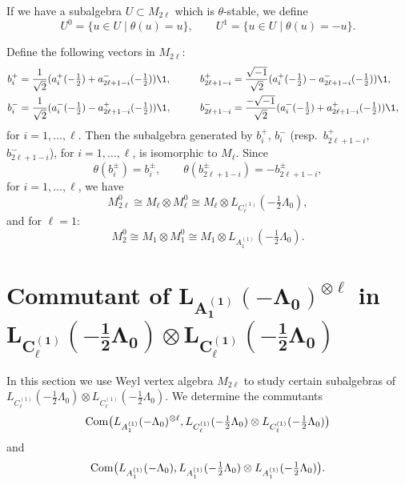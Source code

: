 \documentclass[pdftex]{sigma}
\begin{document}
If we have a subalgebra $U \subset M_{2 \ell}$ which is
$\theta$-stable, we def\/ine
\[
U ^0 = \{ u \in U \; \vert \; \theta (u) = u \}, \qquad U ^1 = \{ u
\in U \; \vert \; \theta (u) = -u \}.
\]

Def\/ine the following vectors in $M_{2 \ell}$:
\begin{alignat*}{3}
&b_{i} ^+ = \frac{1}{\sqrt{2}}( a_{i} ^+ (-\tfrac{1}{2}) +
a_{2\ell+1-i} ^- (-\tfrac{1}{2}) ) {\1},\qquad
&& b_{2\ell+1-i} ^+ = \frac{\sqrt{-1}}{\sqrt{2}}( a_{i} ^+ (-\tfrac{1}{2}) - a_{2\ell+1-i} ^- (-\tfrac{1}{2}) ) {\1}, &  \\
& b_{i} ^- = \frac{1}{\sqrt{2}}( a_{i} ^- (-\tfrac{1}{2}) -
a_{2\ell+1-i}^+ (-\tfrac{1}{2}) ) {\1}, \qquad &&b_{2\ell+1-i} ^- =
\frac{-\sqrt{-1}}{\sqrt{2}}( a_{i} ^- (-\tfrac{1}{2}) +
a_{2\ell+1-i} ^+ (-\tfrac{1}{2}) ) {\1}, &
\end{alignat*} for $i =1, \dots, \ell$. Then the subalgebra generated by $b_i
^+$, $b _i ^-$ (resp.\ $b_{2\ell+1-i} ^+$, $b _{2\ell+1-i} ^-$), for $i
=1, \dots, \ell$, is isomorphic to $M_{\ell}$.
Since
\[ \theta (b_i ^{\pm}) = b_i ^{\pm}, \qquad  \theta (b_{2\ell+1-i}
^{\pm}) = - b_{2\ell+1-i} ^{\pm},\]
for $i =1, \dots, \ell$, we have \[ M_{2 \ell}^{0} \cong M_{\ell}
\otimes M_{\ell} ^0 \cong M_{\ell} \otimes L_{C_{\ell} ^{(1)}}(
-\tfrac{1}{2}\Lambda _{0}),\] and for $\ell =1$: \[ M_{2}^{0} \cong
M_{1} \otimes M_{1} ^0 \cong M_{1} \otimes L_{A_1 ^{(1)}}(
-\tfrac{1}{2}\Lambda _{0}).\]




\section[Commutant of $L_{A_1 ^{(1)}}(- \Lambda_0) ^{\otimes \ell}$ in  $L_{C_{\ell} ^{(1)}}(-\frac{1}{2}\Lambda_0)
\otimes L_{C_{\ell} ^{(1)}}(-\frac{1}{2}\Lambda_0)$]{Commutant of $\boldsymbol{L_{A_1 ^{(1)}}(- \Lambda_0) ^{\otimes \ell}}$ in  $\boldsymbol{L_{C_{\ell} ^{(1)}}(-\frac{1}{2}\Lambda_0)
\otimes L_{C_{\ell} ^{(1)}}(-\frac{1}{2}\Lambda_0)}$}

In this section we use Weyl vertex algebra $M_{2 \ell}$ to study
certain subalgebras of $L_{C_{\ell} ^{(1)}}(-\tfrac{1}{2}\Lambda_0)
\otimes L_{C_{\ell} ^{(1)}}(-\tfrac{1}{2}\Lambda_0)$. We determine
the commutants
\[
{\rm Com} \big( L_{A_1 ^{(1)}}(- \Lambda_0) ^{\otimes
\ell},L_{C_{\ell} ^{(1)}}(-\tfrac{1}{2}\Lambda_0) \otimes
L_{C_{\ell} ^{(1)}}(-\tfrac{1}{2}\Lambda_0)\big)
\]
and \[
{\rm Com} \big( L_{A_1 ^{(1)}}(-\Lambda_0),L_{A_1
^{(1)}}(-\tfrac{1}{2}\Lambda_0) \otimes L_{A_1
^{(1)}}(-\tfrac{1}{2}\Lambda_0) \big).
\]
\end{document}
